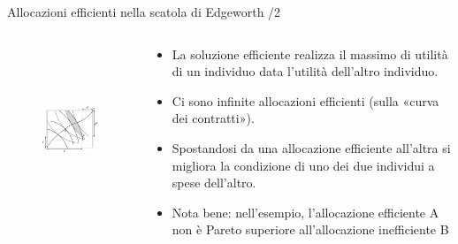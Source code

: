 \documentclass[aspectratio=64,11pt]{beamer}
\begin{document}
\begin{frame}{Allocazioni efficienti nella scatola di Edgeworth /2}
\begin{columns}
\begin{column}{.5\columnwidth}
\begin{figure}
\centering
\includegraphics[height=5cm]{./figure/edgeworth-1.pdf}
\end{figure}
\end{column}

\begin{column}{.5\columnwidth}
\begin{itemize}
\item La soluzione efficiente realizza il massimo di utilità di un individuo data l’utilità dell’altro individuo.
\item Ci sono infinite allocazioni efficienti (sulla «curva dei contratti»).
\item Spostandosi da una allocazione efficiente all’altra si migliora la condizione di uno dei due individui a spese dell’altro.
\item Nota bene: nell’esempio, l’allocazione efficiente A non è Pareto superiore all’allocazione inefficiente B
\end{itemize}
\end{column}
\end{columns}
\end{frame}
\end{document}

